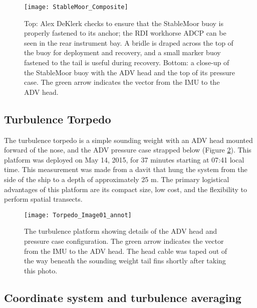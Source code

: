 \begin{figure}[t]
  \centering
  \texttt{[image: StableMoor\_Composite]}
  \caption{Top: Alex DeKlerk checks to ensure that the StableMoor buoy is properly fastened to its anchor; the RDI workhorse ADCP can be seen in the rear instrument bay. A bridle is draped across the top of the buoy for deployment and recovery, and a small marker buoy fastened to the tail is useful during recovery.  Bottom: a close-up of the StableMoor buoy with the ADV head and the top of its pressure case. The green arrow indicates the vector from the IMU to the ADV head. 
}
  \label{fig:SM}
\end{figure}

\subsection{Turbulence Torpedo}

The turbulence torpedo is a simple sounding weight with an ADV head mounted forward of the nose, and the ADV pressure case strapped below (Figure \ref{fig:torpedo}). This platform was deployed on May 14, 2015, for 37 minutes starting at 07:41 local time.  This measurement was made from a davit that hung the system from the side of the ship to a depth of approximately 25 m. The primary logistical advantages of this platform are its compact size, low cost, and the flexibility to perform spatial transects.  

\begin{figure}[th]
  \centering
  \texttt{[image: Torpedo\_Image01\_annot]}
  \caption{The turbulence platform showing details of the ADV head and pressure case configuration. The green arrow indicates the vector from the IMU to the ADV head. The head cable was taped out of the way beneath the sounding weight tail fins shortly after taking this photo.}
  \label{fig:torpedo}
\end{figure}

\subsection{Coordinate system and turbulence averaging}

